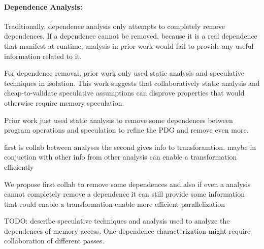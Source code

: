 \paragraph{Dependence Analysis:}
%
Traditionally, dependence analysis only attempts to completely remove
dependences. If a dependence cannot be removed, because it is a real dependence
that manifest at runtime, analysis in prior work would fail to provide any
useful information related to it.

%
For dependence removal, prior work only used static analysis and speculative
techniques in isolation.
%
This work suggests that collaboratively static analysis and cheap-to-validate
speculative assumptions can disprove properties that would otherwise require
memory speculation.


Prior work just used static analysis to remove some dependences between program
operations and speculation to refine the PDG and remove even more.

first is collab between analyses
the second gives info to transforamtion.
maybe in conjuction with other info from other analysis can enable a
transformation efficiently

We propose first collab to remove some dependences and
also if even a analysis cannot completely remove a dependence it can still
provide some information that could enable a transformation enable more
efficient parallelization

TODO: describe speculative techniques and analysis used to analyze the
dependences of memory access.  One dependence characterization might require
collaboration of different passes.




